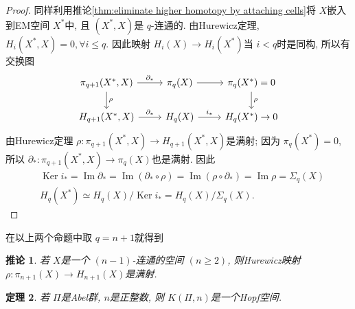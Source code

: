\documentclass{ctexart}
\theoremstyle{plain}
\newtheorem{theorem}{定理}[section]
\newtheorem{corollary}[theorem]{推论}
\theoremstyle{definition}
\begin{document}
        \begin{proof}
            同样利用推论\ref{thm:eliminate higher homotopy by attaching cells}将 $X$嵌入到EM空间 $X^{*}$中, 且 $(X^{*},X)$是 $q$-连通的. 由Hurewicz定理,  $H_{i}(X^{*},X)=0, \forall i\le q$. 因此映射 $H_{i}(X)\to H_{i}(X^{*})$当 $i<q$时是同构, 所以有交换图
            \begin{equation*}
                \begin{tikzcd}
                    \pi_{q+1}(X^*, X) \arrow[r, "\partial_*"] \arrow[d, "\rho"] & \pi_q(X) \arrow[r] & \pi_q(X^*) = 0 \arrow[d, "\rho"] \\
                    H_{q+1}(X^*, X) \arrow[r, "\partial_*"] & H_q(X) \arrow[r, "i_*"] & H_q(X^*) \to 0
                \end{tikzcd}
            \end{equation*}
            由Hurewicz定理 $\rho:\pi_{q+1}(X^{*},X)\to H_{q+1}(X^{*},X)$是满射; 因为 $\pi_{q}(X^{*})=0$, 所以 $\partial_* :\pi_{q+1}(X^{*},X)\to \pi_{q}(X)$也是满射. 因此 
            \begin{equation*}
                \begin{aligned}
                    & \operatorname{Ker} i_*=\operatorname{Im} \partial_*=\operatorname{Im}\left(\partial_* \circ \rho\right)=\operatorname{Im}\left(\rho \circ \partial_*\right)=\operatorname{Im} \rho=\Sigma_q(X) \\
                    & H_q\left(X^*\right) \simeq H_q(X) / \operatorname{Ker} i_*=H_q(X) / \Sigma_q(X) .
                \end{aligned}
            \end{equation*}
        \end{proof}

        在以上两个命题中取 $q=n+1$就得到

        \begin{corollary}
            若 $X$是一个 $(n-1)$-连通的空间 $(n\ge 2)$, 则Hurewicz映射 $\rho:\pi_{n+1}(X)\to H_{n+1}(X)$是满射.
        \end{corollary}

        \begin{theorem}
            若 $\Pi$是Abel群, $n$是正整数, 则 $K(\Pi,n)$是一个Hopf空间.
        \end{theorem}
\end{document}
